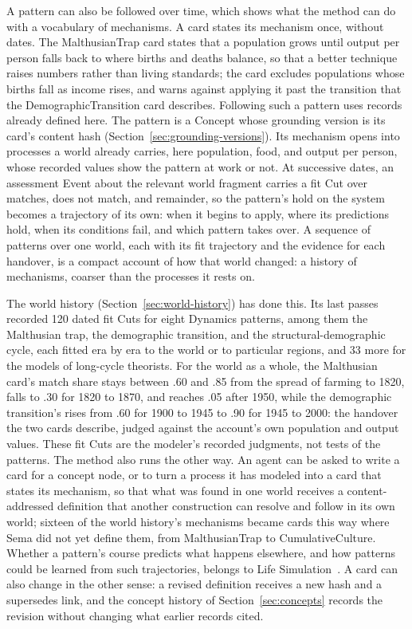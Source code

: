 \documentclass[11pt,a4paper]{article}
\begin{document}
A pattern can also be followed over time, which shows what the method can do
with a vocabulary of mechanisms. A card states its mechanism once, without
dates. The MalthusianTrap card states that a population grows until output per
person falls back to where births and deaths balance, so that a better technique
raises numbers rather than living standards; the card excludes populations whose
births fall as income rises, and warns against applying it past the transition
that the DemographicTransition card describes. Following such a pattern uses
records already defined here. The pattern is a Concept whose grounding version
is its card's content hash (Section~\ref{sec:grounding-versions}). Its mechanism
opens into processes a world already carries, here population, food, and output
per person, whose recorded values show the pattern at work or not. At successive
dates, an assessment Event about the relevant world fragment carries a fit Cut
over matches, does not match, and remainder, so the pattern's hold on the system
becomes a trajectory of its own: when it begins to apply, where its predictions
hold, when its conditions fail, and which pattern takes over. A sequence of
patterns over one world, each with its fit trajectory and the evidence for each
handover, is a compact account of how that world changed: a history of
mechanisms, coarser than the processes it rests on.

The world history (Section~\ref{sec:world-history}) has done this. Its last
passes recorded 120 dated fit Cuts for eight Dynamics patterns, among them the
Malthusian trap, the demographic transition, and the structural-demographic
cycle, each fitted era by era to the world or to particular regions, and 33 more
for the models of long-cycle theorists. For the world as a whole, the Malthusian
card's match share stays between .60 and .85 from the spread of farming to 1820,
falls to .30 for 1820 to 1870, and reaches .05 after 1950, while the demographic
transition's rises from .60 for 1900 to 1945 to .90 for 1945 to 2000: the
handover the two cards describe, judged against the account's own population and
output values. These fit Cuts are the modeler's recorded judgments, not tests of
the patterns. The method also runs the other way. An agent can be asked to write
a card for a concept node, or to turn a process it has modeled into a card that
states its mechanism, so that what was found in one world receives a
content-addressed definition that another construction can resolve and follow in
its own world; sixteen of the world history's mechanisms became cards this way
where Sema did not yet define them, from MalthusianTrap to CumulativeCulture.
Whether a pattern's course predicts what happens elsewhere, and how patterns
could be learned from such trajectories, belongs to Life
Simulation~\cite{westerbergLifeSimulation2026}. A card can also change in the
other sense: a revised definition receives a new hash and a supersedes link, and
the concept history of Section~\ref{sec:concepts} records the revision without
changing what earlier records cited.
\end{document}
